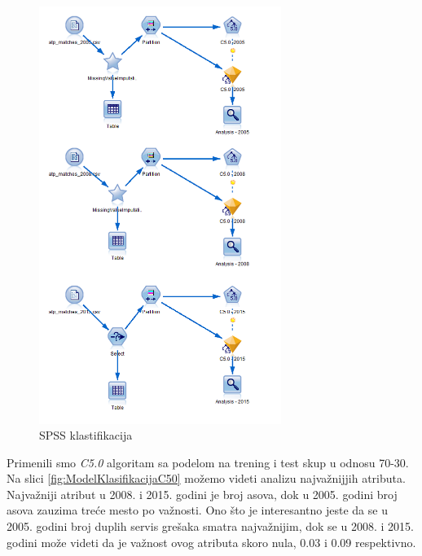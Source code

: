 \documentclass[a4paper]{article}
\begin{document}
\begin{figure}[H]
	\begin{center}
		\includegraphics[width=0.7\textwidth]{Klasifikacija/C50/SPSS_C50_Surface.png}
	\end{center}
	\caption{SPSS klastifikacija}
	\label{fig:SPSS_CvoroviKlasifikacija}
\end{figure}

Primenili smo \textit{C5.0} algoritam sa podelom na trening i test skup u odnosu 70-30. Na slici \ref{fig:ModelKlasifikacijaC50} možemo videti analizu najvažnijjih atributa. Najvažniji atribut u 2008. i 2015. godini je broj asova, dok u 2005. godini broj asova zauzima treće mesto po važnosti. Ono što je interesantno jeste da se u 2005. godini broj duplih servis grešaka smatra najvažnijim, dok se u 2008. i 2015. godini može videti da je važnost ovog atributa skoro nula, 0.03 i 0.09 respektivno.
\end{document}
